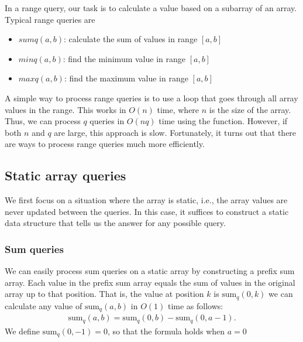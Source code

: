 \documentclass{report}
\begin{document}
    \pagebreak 
    \bigbreak \noindent 
    In a range query, our task is to calculate a value based on a subarray of an array. Typical range queries are
    \begin{itemize}
        \item $sumq(a,b)$: calculate the sum of values in range $[a,b]$
        \item $minq(a,b)$: find the minimum value in range $[a,b]$
        \item $maxq(a,b)$: find the maximum value in range $[a,b]$
    \end{itemize}
    \bigbreak \noindent 
    A simple way to process range queries is to use a loop that goes through all array values in the range.
    \bigbreak \noindent 
    This works in $O(n)$ time, where $n$ is the size of the array. Thus, we can process $q$ queries in $O(nq)$ time using the function. However, if both $n$ and $q$ are large, this approach is slow. Fortunately, it turns out that there are ways to process range queries much more efficiently.

    \bigbreak \noindent 
    \subsection{Static array queries}
    \bigbreak \noindent 
    We first focus on a situation where the array is static, i.e., the array values are never updated between the queries. In this case, it suffices to construct a static data structure that tells us the answer for any possible query.
    \bigbreak \noindent 
    \subsubsection{Sum queries}
    \bigbreak \noindent 
    We can easily process sum queries on a static array by constructing a prefix sum array. Each value in the prefix sum array equals the sum of values in the original array up to that position. That is, the value at position $k$ is $\text{sum}_{q}(0,k) $
    \bigbreak \noindent 
    we can calculate any value of $\text{sum}_{q}(a,b)$ in $O(1)$ time as follows:
    \begin{align*}
        \text{sum}_{q}(a,b) = \text{sum}_{q}(0,b) - \text{sum}_{q}(0,a-1)
    .\end{align*}
    We define $\text{sum}_{q}(0,-1) = 0$, so that the formula holds when $a=0$

    \bigbreak \noindent 
\end{document}
